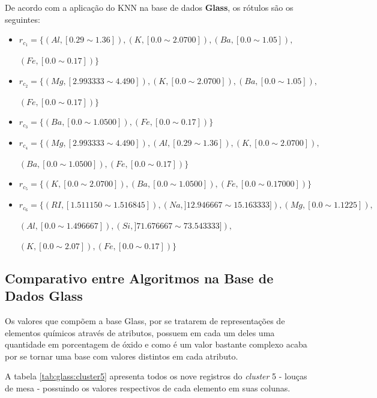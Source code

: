 De acordo com a aplicação do KNN na base de dados \textbf{Glass}, os rótulos são os seguintes:
\begin{itemize}[noitemsep]
 \item ${r_{c_1}=\{(Al,[ 0.29 \sim 1.36 ] ),(K,[ 0.0 \sim  2.0700 ] ), (Ba,[ 0.0 \sim 1.05 ] ),}$
 
 ${ (Fe,[ 0.0 \sim 0.17] )  \} }$
 \item ${r_{c_2}=\{(Mg, [ 2.993333 \sim  4.490]),(K,[ 0.0 \sim  2.0700 ] ), (Ba,[ 0.0 \sim 1.05 ] ),}$
 
 ${ (Fe,[ 0.0 \sim 0.17] )  \} }$
 \item ${r_{c_3}=\{ (Ba,[ 0.0 \sim 1.0500 ] ),(Fe,[ 0.0 \sim 0.17] )  \} }$
 \item ${r_{c_4}=\{(Mg, [ 2.993333 \sim  4.490]), (Al,[ 0.29 \sim 1.36 ] ),(K,[ 0.0 \sim  2.0700 ] ),}$
 
 ${ (Ba,[ 0.0 \sim 1.0500 ] ), (Fe,[ 0.0 \sim 0.17] )  \} }$
 \item ${r_{c_5}=\{ (K,[ 0.0 \sim  2.0700 ] ), (Ba,[ 0.0 \sim 1.0500 ] ), (Fe,[ 0.0 \sim 0.17000] ) \} }$
 \item ${r_{c_6}=\{ (RI,[ 1.511150 \sim  1.516845  ] ),(Na,]12.946667 \sim 15.163333 ] ),  (Mg,[ 0.0 \sim  1.1225  ] ), }$
 
 ${ (Al,[0.0 \sim  1.496667 ] ), (Si,] 71.676667 \sim  73.543333 ] ),  }$
 
 ${ (K,[ 0.0 \sim 2.07] ),(Fe,[ 0.0 \sim 0.17 ] ) \} }$
\end{itemize}


\subsection{Comparativo entre Algoritmos na Base de Dados Glass} \label{cap:resultados:ssec:compalgoritmos:glass}


Os valores que compõem a base Glass, por se tratarem de representações de elementos químicos através de atributos, possuem em cada um deles uma quantidade em porcentagem de óxido e como é um valor bastante complexo acaba por se tornar uma base com valores distintos em cada atributo. 

A tabela \ref{tab:glass:cluster5} apresenta todos os nove registros do \textit{cluster} 5 - louças de mesa - possuindo os valores respectivos de cada elemento em suas colunas.


